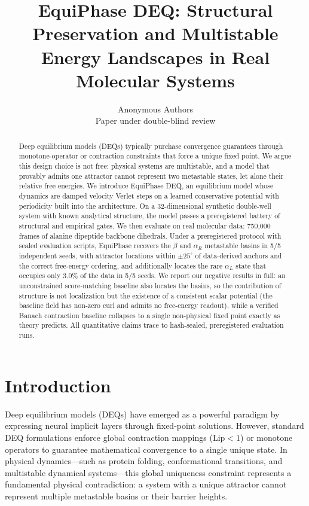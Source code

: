\documentclass{article}
\title{EquiPhase DEQ: Structural Preservation and Multistable Energy Landscapes in Real Molecular Systems}
\author{Anonymous Authors\\
Paper under double-blind review}
\begin{document}
\maketitle

\begin{abstract}
Deep equilibrium models (DEQs) typically purchase convergence guarantees
through monotone-operator or contraction constraints that force a unique
fixed point. We argue this design choice is not free: physical systems are
multistable, and a model that provably admits one attractor cannot represent
two metastable states, let alone their relative free energies. We introduce
EquiPhase DEQ, an equilibrium model whose dynamics are damped velocity Verlet
steps on a learned conservative potential with periodicity built into the
architecture. On a 32-dimensional synthetic double-well system with known
analytical structure, the model passes a preregistered battery of structural
and empirical gates. We then evaluate on real molecular data: 750{,}000
frames of alanine dipeptide backbone dihedrals. Under a preregistered
protocol with sealed evaluation scripts, EquiPhase recovers the
$\beta$ and $\alpha_R$ metastable basins in 5/5 independent seeds, with
attractor locations within $\pm25^\circ$ of data-derived anchors and the
correct free-energy ordering, and additionally locates the rare
$\alpha_L$ state that occupies only 3.0\% of the data in 5/5 seeds. We report
our negative results in full: an unconstrained score-matching baseline also
locates the basins, so the contribution of structure is not localization but
the existence of a consistent scalar potential (the baseline field has
non-zero curl and admits no free-energy readout), while a verified Banach
contraction baseline collapses to a single non-physical fixed point exactly
as theory predicts. All quantitative claims trace to hash-sealed,
preregistered evaluation runs.
\end{abstract}

\section{Introduction}
Deep equilibrium models (DEQs) have emerged as a powerful paradigm by expressing neural implicit layers through fixed-point solutions. However, standard DEQ formulations enforce global contraction mappings ($\text{Lip} < 1$) or monotone operators to guarantee mathematical convergence to a single unique state. In physical dynamics—such as protein folding, conformational transitions, and multistable dynamical systems—this global uniqueness constraint represents a fundamental physical contradiction: a system with a unique attractor cannot represent multiple metastable basins or their barrier heights.
\end{document}
